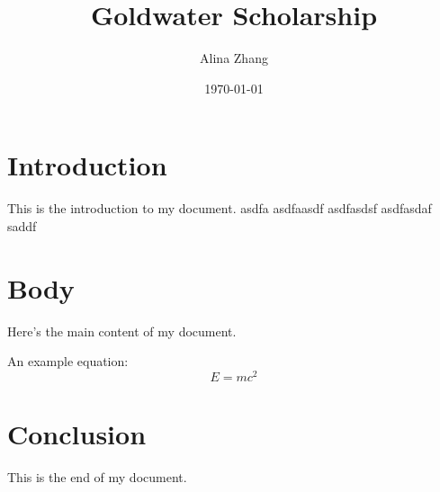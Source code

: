 \documentclass[12pt]{article}
\title{Goldwater Scholarship}
\author{Alina Zhang}
\date{\today}           %
\begin{document}
\maketitle              %

\section{Introduction}
This is the introduction to my document.
asdfa
asdfaasdf
asdfasdsf
asdfasdaf
saddf


\section{Body}

Here's the main content of my document. 

An example equation:
\begin{equation}
    E = mc^2
\end{equation}

\section{Conclusion}
This is the end of my document.
\end{document}
